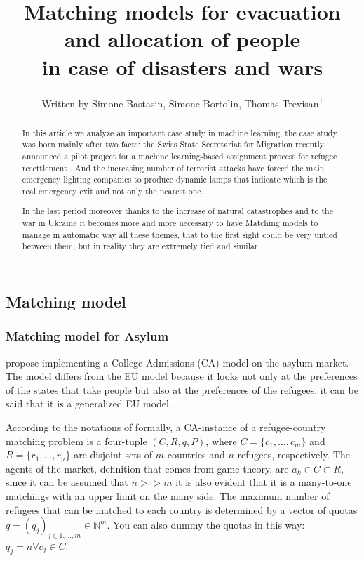 \documentclass[letterpaper]{article} %
\title{Matching models for evacuation and allocation of people\\in case of disasters and wars}
\author{
    Written by Simone Bastasin, Simone Bortolin, Thomas Trevisan\textsuperscript{\rm 1}
    \\
}
\begin{document}
\maketitle

\begin{abstract}
    In this article we analyze an important case study in machine learning, the case study was born mainly after two facts:
    the Swiss State Secretariat for Migration recently announced a pilot project for a machine
    learning-based assignment process for refugee resettlement \cite{olbergml}. 
    And the increasing number of terrorist attacks have forced the main emergency lighting companies to produce dynamic lamps 
    that indicate which is the real emergency exit and not only the nearest one.

    In the last period moreover thanks to the increase of natural catastrophes and to the war in Ukraine it becomes more and more 
    necessary to have Matching models to manage in automatic way all these themes, that to the first sight could be very untied 
    between them, but in reality they are extremely tied and similar.
\end{abstract}

\noindent \cite{olbergml} \cite{basshuysen} \cite{delacretaz_2020} \cite{andersson} 

\subsection{Matching model}

\cite{olbergml} \cite{basshuysen} \cite{delacretaz_2020} 

\subsubsection{Matching model for Asylum}

\cite{olbergml} \cite{basshuysen} \cite{delacretaz_2020}


\cite{fernandez} propose implementing a College Admissions (CA)
model on the asylum market. The model differs from the EU model\cite{basshuysen} because it looks not only at the preferences of the states that take people but also at the preferences of the refugees.
it can be said that it is a generalized EU model.

According to the notations of \cite{salles} formally, a CA-instance of a refugee-country matching problem is a four-tuple \((C, R, q, P)\), where
\(C = \{c_1, ..., c_m\}\) and \(R = \{r_1, ...,r_n\}\) are disjoint sets of \(m\) countries and \(n\) refugees, respectively.
The agents of the market, definition that comes from game theory, are \(a_k \in C\subset R\),
since it can be assumed that \(n >> m\) it is also evident that it is a many-to-one matchings with an upper limit on the many side.
The maximum number of refugees that can be matched to
each country is determined by a vector of quotas \(q = (q_j)_{j\in {1,...,m}} \in \mathbb{N}^m\).
You can also dummy the quotas in this way:  \(q_j = n \forall c_j \in C\).
\end{document}
